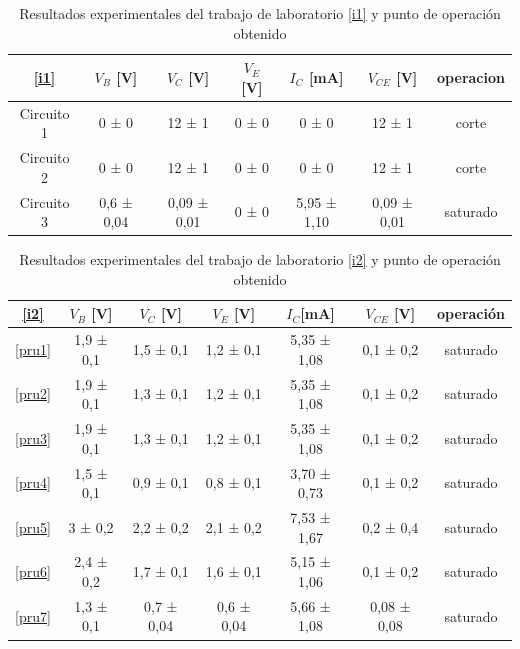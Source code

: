 \documentclass[10pt, a4paper]{article}
\begin{document}
    \begin{table}[h!]
        \centering
        \caption{Resultados experimentales del trabajo de laboratorio \ref{i1} y punto de operación obtenido}
        \label{tab:1}
        \begin{tabular}{|c|c|c|c|c|c|c|} \hline
            \ref{i1}         & $V_B$ [V]  &$V_C$ [V] &$V_E$ [V] &$I_C$ [mA] & $V_{CE}$ [V] & operacion \\ \hline
            Circuito 1     &0 ± 0      &       12 ± 1      &       0 ± 0        &0 ± 0  &  12 ± 1 & corte \\
            Circuito 2     & 0 ± 0      &       12 ± 1      &       0 ± 0        & 0 ± 0 & 12 ± 1 & corte\\
            Circuito 3     &0,6 ± 0,04  &  0,09 ± 0,01   &    0 ± 0       &5,95 ± 1,10 &  0,09 ± 0,01  & saturado \\ \hline
        \end{tabular}
    \end{table}

    \begin{table}[h!]
        \centering
        \caption{Resultados experimentales del trabajo de laboratorio \ref{i2} y punto de operación obtenido}
        \label{tab:2}
        \begin{tabular}{|c|c|c|c|c|c|c|} \hline
            \ref{i2}   &  $V_B$ [V]       &    $V_C$ [V]      &    $V_E$ [V]      &  $I_C$[mA]&  $V_{CE}$ [V] & operación   \\ \hline
            \ref{pru1}  &  1,9 ± 0,1    &   1,5 ± 0,1&   1,2 ± 0,1   &     5,35 ± 1,08    &   0,1 ± 0,2   & saturado   \\
            \ref{pru2}&1,9 ± 0,1    &1,3 ± 0,1&   1,2 ± 0,1   & 5,35 ± 1,08&   0,1 ± 0,2   & saturado   \\
            \ref{pru3}    &1,9 ± 0,1    &   1,3 ± 0,1&   1,2 ± 0,1   &    5,35 ± 1,08&    0,1 ± 0,2  & saturado   \\
            \ref{pru4}&  1,5 ± 0,1    &   0,9 ± 0,1&   0,8 ± 0,1   &    3,70 ± 0,73      &    0,1 ± 0,2  & saturado   \\
            \ref{pru5}&   3 ± 0,2&2,2 ± 0,2     &   2,1 ± 0,2   &    7,53 ± 1,67&    0,2 ± 0,4   & saturado   \\
            \ref{pru6}&  2,4 ± 0,2&   1,7 ± 0,1&   1,6 ± 0,1   &5,15 ± 1,06    &    0,1 ± 0,2   & saturado   \\
            \ref{pru7}&  1,3 ± 0,1  &   0,7 ± 0,04 &   0,6 ± 0,04&    5,66 ± 1,08    &   0,08 ± 0,08 & saturado   \\ \hline
        \end{tabular}
    \end{table}
\end{document}
